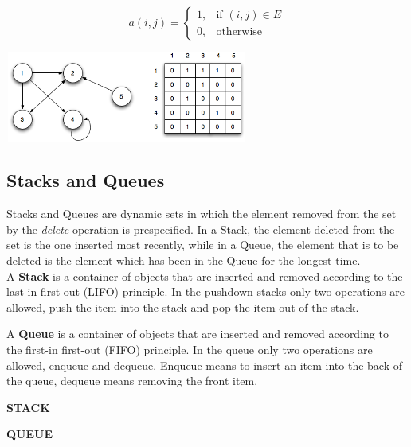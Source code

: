 \documentclass[11pt,a4paper]{extarticle}
\begin{document}
\[
    a(i,j)= 
\begin{cases}
    1,& \text{if } (i,j) \in E\\
    0,& \text{otherwise}
\end{cases}
\]

\begin{center}
	\includegraphics[width=8cm, height=3cm]{matrix}
\end{center}
 
\subsection{Stacks and Queues} 
Stacks and Queues are dynamic sets in which the element removed from the set by the \textit{delete} operation is prespecified. In a Stack, the element deleted from the set is the one inserted most recently, while in a Queue, the element that is to be deleted is the element which has been in the Queue for the longest time. \\

A \textbf{Stack} is a container of objects that are inserted and removed according to the last-in first-out (LIFO) principle. In the pushdown stacks only two operations are allowed, push the item into the stack and pop the item out of the stack.

A \textbf{Queue} is a container of objects that are inserted and removed according to the first-in first-out (FIFO) principle. In the queue only two operations are allowed, enqueue and dequeue. Enqueue means to insert an item into the back of the queue, dequeue means removing the front item.
\newpage
\begin{multicols}{2}

\begin{center}
	\textbf{STACK}
\end{center}



\columnbreak

\begin{center}
	\textbf{QUEUE}
\end{center}



\end{multicols}
\end{document}
